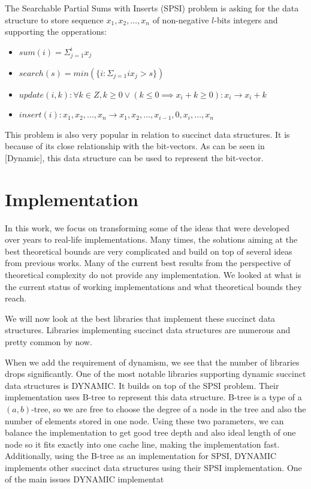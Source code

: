 \begin{theorem}
The Searchable Partial Sums with Inserts (SPSI) problem is asking for the data structure to
store sequence $x_1, x_2, \ldots , x_n$ of non-negative $l$-bits integers and supporting the opperations:
\begin{itemize}
    \item $sum(i) = \Sigma_{j=1}^{i} x_j$
    \item $search(s) = min(\{i : \Sigma_{j=1}{i} x_j > s \})$
    \item $update(i, k): \forall k \in Z, k \geq 0 \lor (k\leq 0 \implies x_i + k \geq 0): x_i \rightarrow x_i + k$
    \item $insert(i): x_1, x_2,\ldots, x_n \rightarrow x_1, x_2,\ldots , x_{i-1}, 0, x_{i}, \ldots , x_n$
\end{itemize}
\end{theorem}

This problem is also very popular in relation to succinct data structures. It is because of its close relationship with the bit-vectors.
As can be seen in [Dynamic], this data structure can be used to represent the bit-vector.

\section{Implementation}

In this work, we focus on transforming some of the ideas that were developed over years to real-life implementations. Many times, the solutions aiming at the best theoretical bounds are very complicated and build on top of several ideas from previous works. Many of the current best results from the perspective of theoretical complexity do not provide any implementation. We looked at what is the current status of working implementations and what theoretical bounds they reach.

We will now look at the best libraries that implement these succinct data structures. Libraries implementing succinct data structures are numerous and pretty common by now.

When we add the requirement of dynamism, we see that the number of libraries drops significantly. One of the most notable libraries supporting 
dynamic succinct data structures is DYNAMIC. It builds on top of the SPSI problem. Their implementation uses B-tree to represent this data structure. B-tree is a type of a $(a, b)$-tree, so we are free to choose the degree of a node in the tree and also the number of elements stored in one node. Using these two parameters, we can balance the implementation to get good tree depth and also ideal length of one node so it fits exactly into one cache line, making the implementation fast. Additionally, using the B-tree as an implementation for SPSI, DYNAMIC implements other succinct
data structures using their SPSI implementation. One of the main issues DYNAMIC implementat
